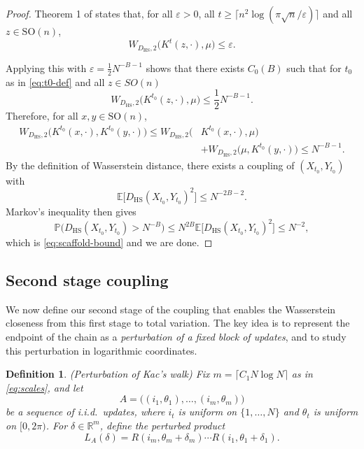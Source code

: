\documentclass[11pt, reqno]{amsart}
\numberwithin{equation}{section}
\newtheorem{definition}{Definition}
\theoremstyle{remark}
\newcommand{\R}{\mathbb{R}}
\newcommand{\E}{\mathbb{E}}
\newcommand{\Prob}{\mathbb{P}}
\newcommand{\1}{\mathbf{1}}
\newcommand{\SO}{\mathrm{SO}}
\newcommand{\HS}{\mathrm{HS}}
\newcommand{\eps}{\varepsilon}
\begin{document}
\begin{proof}
Theorem 1 of \cite{Oliveira} states that, for all $\eps > 0$, all $t\ge \bigl\lceil n^2\log(\pi\sqrt{n}/\eps)\bigr\rceil$ and all $z \in \SO(n)$,
\[
W_{D_{\HS},2}\bigl(K^t(z,\cdot),\mu\bigr)\le \eps.
\]


Applying this with $\eps=\tfrac12 N^{-B-1}$ shows that there exists $C_0(B)$ such that for $t_0$ as in
\eqref{eq:t0-def} and all $z \in SO(n)$
\[
W_{D_{\HS},2}\bigl(K^{t_0}(z,\cdot),\mu\bigr)\le \frac12 N^{-B-1}.
\]
Therefore, for all $x,y\in \SO(n)$,
\begin{align*}
W_{D_{\HS},2}\bigl(K^{t_0}(x,\cdot),K^{t_0}(y,\cdot)\bigr) 
\le
W_{D_{\HS},2}\bigl( &K^{t_0}(x,\cdot),\mu\bigr) \\
&+
W_{D_{\HS},2}\bigl(\mu,K^{t_0}(y,\cdot)\bigr) 
\le N^{-B-1}.
\end{align*}
By the definition of Wasserstein distance, there exists a coupling of $(X_{t_0},Y_{t_0})$ with
\[
\E\bigl[D_{\HS}(X_{t_0},Y_{t_0})^2\bigr]\le N^{-2B-2}.
\]
Markov's inequality then gives
\[
\Prob\!\bigl(D_{\HS}(X_{t_0},Y_{t_0})>N^{-B}\bigr)
\le
N^{2B}\E\bigl[D_{\HS}(X_{t_0},Y_{t_0})^2\bigr]
\le N^{-2},
\]
which is \eqref{eq:scaffold-bound} and we are done.
\end{proof}

\subsection{Second stage coupling}
\label{subsec:global-notation}
We now define our second stage of the coupling that enables the Wasserstein closeness from this first
stage to total variation.
The key idea is to represent the endpoint of the chain as a \emph{perturbation of a fixed block of updates}, and to study this perturbation in logarithmic coordinates.

\begin{definition} (Perturbation of Kac's walk) \label{defn:randupdate}
Fix $m = \lceil C_1 N\log N\rceil$ as in \eqref{eq:scales}, and let
\begin{equation}
\label{eq:A-def}
A = \bigl((i_1,\theta_1),\dots,(i_m,\theta_m)\bigr)
\end{equation}
be a sequence of i.i.d.\ updates, where $i_t$ is uniform on $\{1,\dots,N\}$ and $\theta_t$ is uniform on $[0,2\pi)$. For $\delta\in\R^m$, define the perturbed product
\begin{equation}
\label{eq:L-def}
L_A(\delta)
=
R(i_m,\theta_m+\delta_m)\cdots R(i_1,\theta_1+\delta_1).
\end{equation}
\end{definition}
\end{document}
